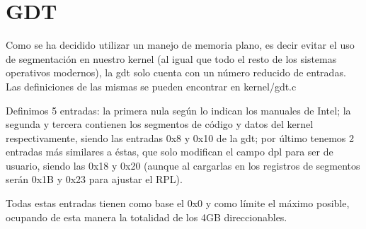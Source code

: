\section{GDT}

Como se ha decidido utilizar un manejo de memoria plano, es decir evitar el uso
de segmentación en nuestro kernel (al igual que todo el resto de los sistemas
operativos modernos), la gdt solo cuenta con un número reducido de entradas.
Las definiciones de las mismas se pueden encontrar en kernel/gdt.c

Definimos 5 entradas: la primera nula según lo indican los manuales de Intel;
la segunda y tercera contienen los segmentos de código y datos del kernel
respectivamente, siendo las entradas 0x8 y 0x10 de la gdt; por último tenemos 2
entradas más similares a éstas, que solo modifican el campo dpl para ser de
usuario, siendo las 0x18 y 0x20 (aunque al cargarlas en los registros de
segmentos serán 0x1B y 0x23 para ajustar el RPL).

Todas estas entradas tienen como base el 0x0 y como límite el máximo posible,
ocupando de esta manera la totalidad de los 4GB direccionables.
